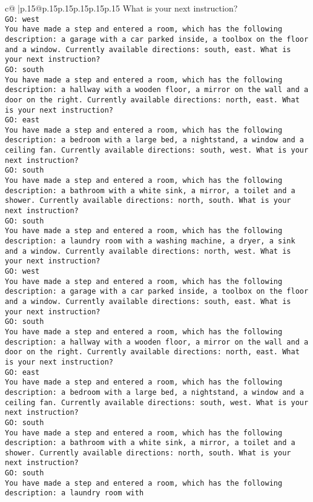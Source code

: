 \documentclass{article}
\begin{document}
{\begin{supertabular}{c@{$\;$}|p{.15\linewidth}@{}p{.15\linewidth}p{.15\linewidth}p{.15\linewidth}p{.15\linewidth}p{.15\linewidth}}
{{{What is your next instruction?\\ \tt GO: west\\ \tt You have made a step and entered a room, which has the following description: a garage with a car parked inside, a toolbox on the floor and a window. Currently available directions: south, east. What is your next instruction?\\ \tt GO: south\\ \tt You have made a step and entered a room, which has the following description: a hallway with a wooden floor, a mirror on the wall and a door on the right. Currently available directions: north, east. What is your next instruction?\\ \tt GO: east\\ \tt You have made a step and entered a room, which has the following description: a bedroom with a large bed, a nightstand, a window and a ceiling fan. Currently available directions: south, west. What is your next instruction?\\ \tt GO: south\\ \tt You have made a step and entered a room, which has the following description: a bathroom with a white sink, a mirror, a toilet and a shower. Currently available directions: north, south. What is your next instruction?\\ \tt GO: south\\ \tt You have made a step and entered a room, which has the following description: a laundry room with a washing machine, a dryer, a sink and a window. Currently available directions: north, west. What is your next instruction?\\ \tt GO: west\\ \tt You have made a step and entered a room, which has the following description: a garage with a car parked inside, a toolbox on the floor and a window. Currently available directions: south, east. What is your next instruction?\\ \tt GO: south\\ \tt You have made a step and entered a room, which has the following description: a hallway with a wooden floor, a mirror on the wall and a door on the right. Currently available directions: north, east. What is your next instruction?\\ \tt GO: east\\ \tt You have made a step and entered a room, which has the following description: a bedroom with a large bed, a nightstand, a window and a ceiling fan. Currently available directions: south, west. What is your next instruction?\\ \tt GO: south\\ \tt You have made a step and entered a room, which has the following description: a bathroom with a white sink, a mirror, a toilet and a shower. Currently available directions: north, south. What is your next instruction?\\ \tt GO: south\\ \tt You have made a step and entered a room, which has the following description: a laundry room with }}}
\end{supertabular}}
\end{document}
